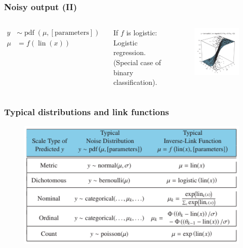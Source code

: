 \documentclass[usenames,dvipsnames,table]{beamer}
\begin{document}
\begin{frame}
\frametitle{Noisy output (II)}
\begin{columns}
\begin{align*}
y &\sim \operatorname{pdf}(\mu, [\textrm{parameters}]) \\
\mu &= f(\operatorname{lin}(x))
\end{align*}

If $f$ is logistic: Logistic regression. (Special case of binary classification).
\begin{figure}
\centering
\includegraphics[width=\textwidth]{img/fig15_10}
\end{figure}
\end{columns}
\end{frame}


\begin{frame}
\frametitle{Typical distributions and link functions}
\begin{figure}
\centering
\includegraphics[width=\textwidth]{img/fig15_12}
\end{figure}
\end{frame}
\end{document}
